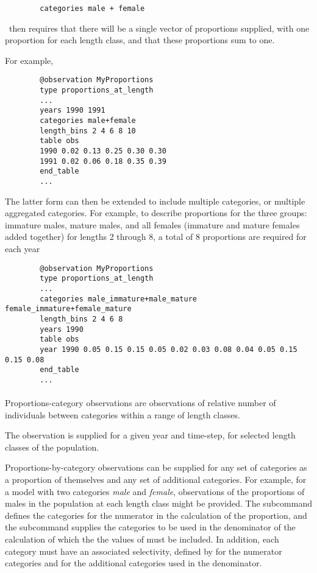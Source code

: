 {\small{\begin{verbatim}
		categories male + female
		\end{verbatim}}}

\CNAME\ then requires that there will be a single vector of proportions supplied, with one proportion for each length class, and that these proportions sum to one.

For example,

{\small{\begin{verbatim}
		@observation MyProportions
		type proportions_at_length
		...
		years 1990 1991
		categories male+female
		length_bins 2 4 6 8 10
		table obs
		1990 0.02 0.13 0.25 0.30 0.30
		1991 0.02 0.06 0.18 0.35 0.39
		end_table
		...
		\end{verbatim}}}

The latter form can then be extended to include multiple categories, or multiple aggregated categories. For example, to describe proportions for the three groups: immature males, mature males, and all females (immature and mature females added together) for lengths 2 through 8, a total of 8 proportions are required for each year

{\small{\begin{verbatim}
		@observation MyProportions
		type proportions_at_length
		...
		categories male_immature+male_mature female_immature+female_mature
		length_bins 2 4 6 8
		years 1990
		table obs
		year 1990 0.05 0.15 0.15 0.05 0.02 0.03 0.08 0.04 0.05 0.15 0.15 0.08
		end_table
		...
		\end{verbatim}}}

\paragraph*{}\label{sec:Observation-ProportionsMatureByLength}
Proportions-category observations are observations of relative number of individuals between categories within a range of length classes.

The observation is supplied for a given year and time-step, for selected length classes of the population.


Proportions-by-category observations can be supplied for any set of categories as a proportion of themselves and any set of additional categories. For example, for a model with two categories \emph{male} and \emph{female}, observations of the proportions of males in the population at each length class might be provided. The subcommand  defines the categories for the numerator in the calculation of the proportion, and the subcommand  supplies the categories to be used in the denominator of the calculation of which the the values of  must be included. In addition, each category must have an associated selectivity, defined by  for the numerator categories and  for the additional categories used in the denominator.


